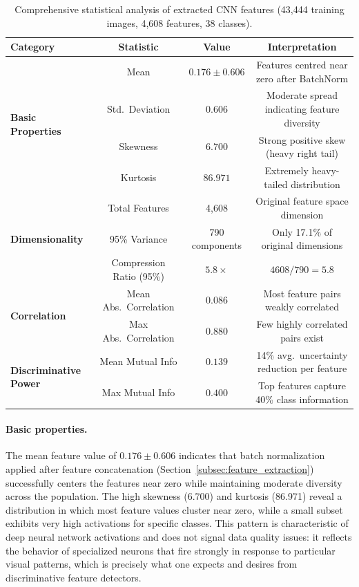 \documentclass[pdflatex,sn-basic]{sn-jnl}
\begin{document}
\begin{table}[htbp]
\caption{Comprehensive statistical analysis of extracted CNN features (43,444 training images, 4,608 features, 38 classes).}
\label{tab:results_comprehensive_stats}
\begin{tabular*}{\textwidth}{@{\extracolsep\fill}lccc@{}}
\toprule
\textbf{Category} & \textbf{Statistic} & \textbf{Value} & \textbf{Interpretation} \\
\midrule
\multirow{4}{*}{\textbf{Basic Properties}}
 & Mean              & $0.176 \pm 0.606$ & Features centred near zero after BatchNorm \\
 & Std.\ Deviation   & $0.606$           & Moderate spread indicating feature diversity \\
 & Skewness          & $6.700$           & Strong positive skew (heavy right tail) \\
 & Kurtosis          & $86.971$          & Extremely heavy-tailed distribution \\
\midrule
\multirow{3}{*}{\textbf{Dimensionality}}
 & Total Features          & 4,608       & Original feature space dimension \\
 & 95\% Variance           & 790 components & Only 17.1\% of original dimensions \\
 & Compression Ratio (95\%)& $5.8\times$ & $4608 / 790 = 5.8$ \\
\midrule
\multirow{2}{*}{\textbf{Correlation}}
 & Mean Abs.\ Correlation & $0.086$ & Most feature pairs weakly correlated \\
 & Max Abs.\ Correlation  & $0.880$ & Few highly correlated pairs exist \\
\midrule
\multirow{2}{*}{\textbf{Discriminative Power}}
 & Mean Mutual Info & $0.139$ & 14\% avg.\ uncertainty reduction per feature \\
 & Max Mutual Info  & $0.400$ & Top features capture 40\% class information \\
\bottomrule
\end{tabular*}
\end{table}

\paragraph{Basic properties.}
The mean feature value of $0.176 \pm 0.606$ indicates that batch normalization applied after feature concatenation (Section~\ref{subsec:feature_extraction}) successfully centers the features near zero while maintaining moderate diversity across the population. The high skewness (6.700) and kurtosis (86.971) reveal a distribution in which most feature values cluster near zero, while a small subset exhibits very high activations for specific classes. This pattern is characteristic of deep neural network activations and does not signal data quality issues: it reflects the behavior of specialized neurons that fire strongly in response to particular visual patterns, which is precisely what one expects and desires from discriminative feature detectors.
\end{document}
